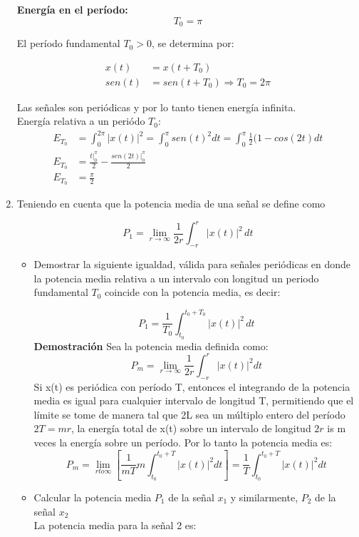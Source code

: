 \documentclass[12pt,a4paper]{report}
\begin{document}
\begin{enumerate}[label=\alph*),left=0pt]
    \textbf{Energía en el período:}
    $$
    T_0 = \pi
    $$

        El período fundamental $T_0>0$, se determina por:

          $$
        \begin{aligned}
        x(t) &= x(t+T_0)\\
        sen(t)&=sen(t+T_0) \Rightarrow T_0=2\pi
        \end{aligned}
        $$  

        
        Las señales son periódicas y por lo tanto tienen energía infinita. 
        \\

        Energía relativa a un periódo $T_0$:
        $$
	\begin{aligned}
		E_{T_{0}}&=\int_0^{2\pi}|x(t)|^2=\int _0^\pi sen(t)^2dt=\int_0^\pi \frac{1}{2}(1-cos(2t) dt\\
        E_{T_0}&=\frac{t|^\pi_0}{2}-\frac{sen(2t)|^\pi_0}{2}\\
	E_{T_0}&=\frac{\pi}{2}
	\end{aligned}
	$$
	
  \item Teniendo en cuenta que la potencia media de una señal se define como

  $$P_1 = \lim_{r \to \infty} \frac{1}{2r} \int_{-r}^{r} |x(t)|^2 \, dt$$

    \begin{itemize}[left=0pt]
    \item Demostrar la siguiente igualdad, válida para señales periódicas en donde la potencia media relativa a un
      intervalo con longitud un periodo fundamental $T_0$ coincide con la potencia media, es decir:

     $$P_1 = \frac{1}{T_0} \int_{t_0}^{t_0 + T_0} |x(t)|^2 \, dt$$
	\textbf{Demostración}
Sea la potencia media definida como:
        $$
        P_m=\lim _{r \to \infty} \frac{1}{2r}\int_{-r}^{r}|x(t)|^2dt
	$$
	Si x(t) es periódica con período T, entonces el integrando de la potencia media es igual
	para cualquier intervalo de longitud T, permitiendo que el límite se tome de manera tal 
que 2L sea un múltiplo entero del período  $2T=mr$, la energía total de x(t) sobre un intervalo de longitud $2r$ is m veces la energía sobre un período. Por lo tanto la potencia media es:
        $$P_m=\lim_{r to \infty}[\frac{1}{mT}m\int_{t_0}^{t_0+T} |x(t)|^2 dt]=\frac{1}{T}\int_{t_0}^{t_0+T} |x(t)|^2 dt$$
    \item Calcular la potencia media $P_1$ de la señal $x_1$ y similarmente, $P_2$ de la señal $x_2$\\
   La potencia media para la señal 2 es:


\end{itemize}
\end{enumerate}
\end{document}
